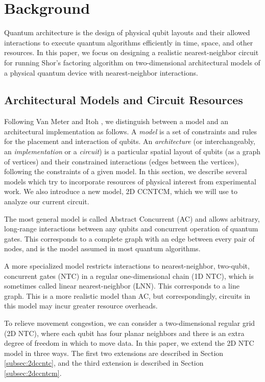 \section{Background}
\label{sec:bg}

Quantum architecture is the design of physical qubit layouts
and their allowed interactions to execute
quantum algorithms efficiently in time, space, and other
resources.
In this paper, we focus on designing a realistic nearest-neighbor circuit for running
Shor's factoring algorithm on two-dimensional
architectural models of a physical quantum device with nearest-neighbor
interactions.

\subsection{Architectural Models and Circuit Resources}
\label{subsec:models}

Following Van Meter and Itoh \cite{VanMeter2005},
we distinguish between a model and an architectural implementation as follows.
A \emph{model} is a set of constraints and rules for the placement and
interaction of qubits.
An \emph{architecture} (or interchangeably, an \emph{implementation} 
or a \emph{circuit}) is a particular
spatial layout of qubits (as a graph of vertices) and their
constrained interactions (edges between the vertices),
following the constraints of a given model. In this section, we describe
several models which try to incorporate resources of physical interest from
experimental work. We also introduce a new model,
\textsc{2D CCNTCM}, which we will use to analyze our current circuit.

The most general model is called Abstract Concurrent (\textsc{AC})
and allows arbitrary, long-range interactions between any qubits and concurrent
operation of quantum gates.
This corresponds to a complete graph with an edge between every pair of nodes,
and is the model assumed in most quantum algorithms.

A more specialized model restricts interactions to nearest-neighbor, two-qubit,
concurrent gates (\textsc{NTC}) in a regular one-dimensional chain (1D NTC),
which is sometimes called linear nearest-neighbor (\textsc{LNN}).
This corresponds to a line graph. This is a more realistic model than
\textsc{AC}, but correspondingly, circuits in this model may incur greater
resource overheads.

To relieve movement congestion,
we can consider a two-dimensional regular grid
(2D NTC), where each
qubit has four planar neighbors and 
there is an extra degree of freedom
in which to move data.
In this paper, we extend the \textsc{2D NTC} model in three ways.
The first two extensions are described in Section \ref{subsec:2dccntc},
and the third extension is described in Section \ref{subsec:2dccntcm}.

